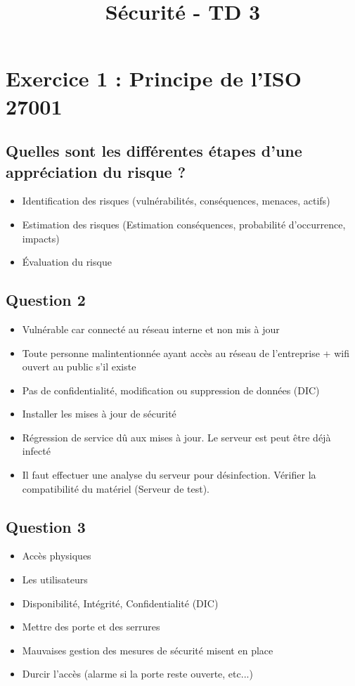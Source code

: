 \documentclass[11pt,a4paper]{article}
\title{Sécurité - TD 3}
\begin{document}
	
	\maketitle
	
	\section{Exercice 1 : Principe de l'ISO 27001}
	
	\subsection{Quelles sont les différentes étapes d'une appréciation du risque ?}
	
	\begin{itemize}
		\item Identification des risques (vulnérabilités, conséquences, menaces, actifs)
		\item Estimation des risques (Estimation conséquences, probabilité d'occurrence, impacts)
		\item Évaluation du risque
	\end{itemize}

	\subsection{Question 2}
	
	\begin{itemize}
		\item Vulnérable car connecté au réseau interne et non mis à jour
		\item Toute personne malintentionnée ayant accès au réseau de l'entreprise + wifi ouvert au public s'il existe
		\item Pas de confidentialité, modification ou suppression de données (DIC)
		\item Installer les mises à jour de sécurité
		\item Régression de service dû aux mises à jour. Le serveur est peut être déjà infecté
		\item Il faut effectuer une analyse du serveur pour désinfection. Vérifier la compatibilité du matériel (Serveur de test).
	\end{itemize}

	\subsection{Question 3}

	\begin{itemize}
		\item Accès physiques
		\item Les utilisateurs
		\item Disponibilité, Intégrité, Confidentialité (DIC)
		\item Mettre des porte et des serrures
		\item Mauvaises gestion des mesures de sécurité misent en place
		\item Durcir l'accès (alarme si la porte reste ouverte, etc...)
	\end{itemize}
\end{document}
